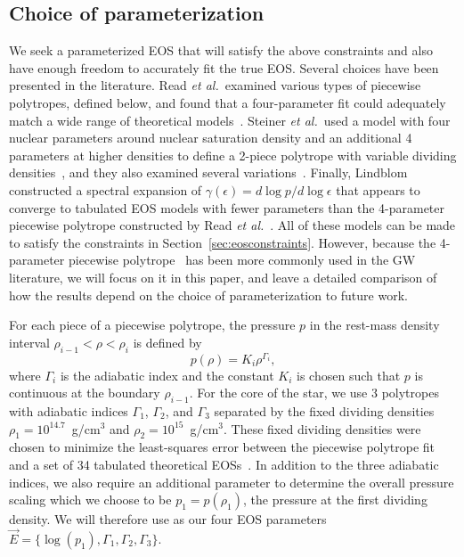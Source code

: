 \documentclass[twocolumn,prd,amssymb,aps,nofootinbib,showpacs,epsf]{revtex4}
\begin{document}
\subsection{Choice of parameterization}
\label{sec:eosparam}

We seek a parameterized EOS that will satisfy the above constraints and also have enough freedom to accurately fit the true EOS. Several choices have been presented in the literature. Read {\it et al.}\ examined various types of piecewise polytropes, defined below, and found that a four-parameter fit could adequately match a wide range of theoretical models~\cite{ReadLackey2009}. Steiner {\it et al.}\ used a model with four nuclear parameters around nuclear saturation density and an additional 4 parameters at higher densities to define a 2-piece polytrope with variable dividing densities~\cite{SteinerLattimerBrown2010}, and they also examined several variations~\cite{SteinerLattimerBrown2013}. Finally, Lindblom constructed a spectral expansion of $\gamma(\epsilon) = d\log p / d\log \epsilon$ that appears to converge to tabulated EOS models with fewer parameters than the 4-parameter piecewise polytrope constructed by Read {\it et al.}~\cite{Lindblom2010}. All of these models can be made to satisfy the constraints in Section~\ref{sec:eosconstraints}. However, because the 4-parameter piecewise polytrope~\cite{ReadLackey2009} has been more commonly used in the GW literature, we will focus on it in this paper, and leave a detailed comparison of how the results depend on the choice of parameterization to future work.

For each piece of a piecewise polytrope, the pressure $p$ in the rest-mass density interval $\rho_{i-1} < \rho < \rho_i$ is defined by
\begin{equation}
p(\rho) = K_i \rho^{\Gamma_i},
\end{equation}
where $\Gamma_i$ is the adiabatic index and the constant $K_i$ is chosen such that $p$ is continuous at the boundary $\rho_{i-1}$. For the core of the star, we use 3 polytropes with adiabatic indices $\Gamma_1$, $\Gamma_2$, and $\Gamma_3$ separated by the fixed dividing densities $\rho_1 = 10^{14.7}$~g/cm$^3$ and $\rho_2 = 10^{15}$~g/cm$^3$. These fixed dividing densities were chosen to minimize the least-squares error between the piecewise polytrope fit and a set of 34 tabulated theoretical EOSs~\cite{ReadLackey2009}. In addition to the three adiabatic indices, we also require an additional parameter to determine the overall pressure scaling which we choose to be $p_1 = p(\rho_1)$, the pressure at the first dividing density. We will therefore use as our four EOS parameters $\vec E = \{\log(p_1), \Gamma_1, \Gamma_2, \Gamma_3\}$.
\end{document}

